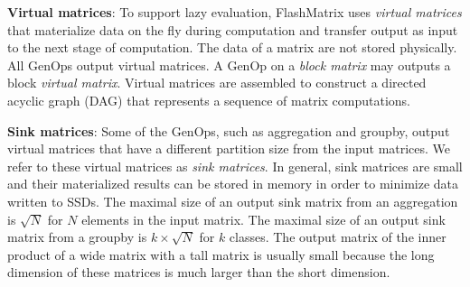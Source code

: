 \vspace{3pt}
\noindent \textbf{Virtual matrices}:
To support lazy evaluation, FlashMatrix uses \textit{virtual matrices} that
materialize data on the fly during computation and transfer output as input to the
next stage of computation.  The data of a matrix are not stored physically.
All GenOps output virtual matrices. A GenOp on a \textit{block matrix} may outputs
a block \textit{virtual matrix}. Virtual matrices are assembled to construct
a directed acyclic graph (DAG) that represents a sequence of matrix computations.

\vspace{3pt}
\noindent \textbf{Sink matrices}: Some of the GenOps, such as aggregation and
groupby, output virtual matrices that have a different partition size from
the input matrices. We refer to these virtual matrices as \textit{sink matrices}.
In general, sink matrices are small and their materialized results can be
stored in memory in order to minimize data written to SSDs. The maximal size
of an output sink matrix from an aggregation
is $\sqrt{N}$ for $N$ elements in the input matrix. The maximal size of
an output sink matrix from a groupby is $k \times \sqrt{N}$ for $k$ classes.
The output matrix of the inner product of a wide matrix with a tall matrix is usually small because
the long dimension of these matrices is much larger than the short dimension.

